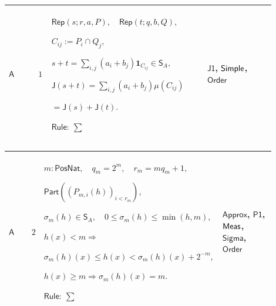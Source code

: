 \documentclass[12pt,reqno]{amsart}
\theoremstyle{blueplain}
\numberwithin{equation}{section}
\begin{document}
{\scriptsize \setlength{\parskip}{0pt}\nointerlineskip
\noindent 
\begin{tabular}{|@{}>{\centering\arraybackslash}m{0.10658\linewidth}|>{\centering\arraybackslash}m{0.03553\linewidth}|>{\centering\arraybackslash}m{0.52105\linewidth}|>{\centering\arraybackslash}m{0.23684\linewidth}|}
\hline
\hypertarget{dct:A1}{$\displaystyle \mathsf{A}$} & $\displaystyle 1$ & $%
\displaystyle \mathsf{Rep}(s;r,a,P),\quad\mathsf{Rep}(t;q,b,Q),$\par$%
\displaystyle C_{ij}:=P_i\cap Q_j,$\par$\displaystyle s+t=\sum_{i,j}(a_i+b_j)%
\mathbf{1}_{C_{ij}}\in\mathsf{S}_A,$\par$\displaystyle \mathsf{J}%
(s+t)=\sum_{i,j}(a_i+b_j)\mu(C_{ij})$\par$\displaystyle {}=\mathsf{J}(s)+%
\mathsf{J}(t).$\par$\displaystyle \mathsf{Rule}:\ \sum$ & \hyperlink{proof:J1}%
{$\displaystyle \mathsf{J1}$}, \hyperlink{lem:Simple}{$\displaystyle \mathsf{%
Simple}$}, \hyperlink{ax:Order}{$\displaystyle \mathsf{Order}$} \\ \hline
\end{tabular}%
}

{\scriptsize \setlength{\parskip}{0pt}\nointerlineskip
\noindent 
\begin{tabular}{|@{}>{\centering\arraybackslash}m{0.10658\linewidth}|>{\centering\arraybackslash}m{0.03553\linewidth}|>{\centering\arraybackslash}m{0.52105\linewidth}|>{\centering\arraybackslash}m{0.23684\linewidth}|}
\hline
\hypertarget{dct:A2}{$\displaystyle \mathsf{A}$} & $\displaystyle 2$ & $%
\displaystyle m:\mathsf{PosNat},\quad q_m=2^m,\quad r_m=mq_m+1,$\par$%
\displaystyle \mathsf{Part}((P_{m,i}(h))_{i<r_m}),$\par$\displaystyle %
\sigma_m(h)\in\mathsf{S}_A,\quad0\le\sigma_m(h)\le\min(h,m),$\par$%
\displaystyle h(x)<m\Rightarrow$\par$\displaystyle \sigma_m(h)(x)\le
h(x)<\sigma_m(h)(x)+2^{-m},$\par$\displaystyle h(x)\ge
m\Rightarrow\sigma_m(h)(x)=m.$\par$\displaystyle \mathsf{Rule}:\ \sum$ & 
\hyperlink{dctdef:Approx}{$\displaystyle \mathsf{Approx}$}, \hyperlink{proof:P1}%
{$\displaystyle \mathsf{P1}$}, \hyperlink{def:Meas}{$\displaystyle \mathsf{%
Meas}$}, \hyperlink{ax:Sigma}{$\displaystyle \mathsf{Sigma}$}, \hyperlink{ax:Order}%
{$\displaystyle \mathsf{Order}$} \\ \hline
\end{tabular}%
}
\end{document}
